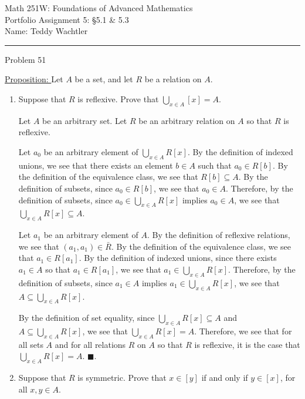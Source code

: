 \documentclass{article}
\theoremstyle{definition}
\newcommand{\header}[3]{
	\begin{center}
	\Large{{#1}} \\
	\smallskip \normalsize {#2} \\
	\smallskip \hfill Name: {#3} \\
	\smallskip \hrule
	\bigskip
	\end{center}}
\newcommand{\problem}[1]{
	\noindent Problem {#1}
	\medskip }
\newcommand{\proposition}{\underline{Proposition: }}
\renewcommand{\proof}{
	\medskip \fbox{Proof}
	\medskip }
\renewcommand{\qed}{\blacksquare}
\begin{document}
	\header
	{Math 251W: Foundations of Advanced Mathematics}
	{Portfolio Assignment 5: \S 5.1 \& 5.3}
	{Teddy Wachtler}


	\problem{51}

	\proposition
	Let $A$ be a set, and let $R$ be a relation on $A$.

	\begin{enumerate}
		\item
		Suppose that $R$ is reflexive.
		Prove that $\bigcup_{x \in A} [x] = A$.

		\proof

		Let $A$ be an arbitrary set.
		Let $R$ be an arbitrary relation on $A$ so that $R$ is reflexive.

		Let $a_0$ be an arbitrary element of $\bigcup_{x \in A} R[x]$.
		By the definition of indexed unions, we see that there exists an element $b \in A$ such that $a_0 \in R[b]$.
		By the definition of the equivalence class, we see that $R[b] \subseteq A$.
		By the definition of subsets, since $a_0 \in R[b]$, we see that $a_0 \in A$.
		Therefore, by the definition of subsets, since $a_0 \in \bigcup_{x \in A} R[x]$ implies $a_0 \in A$, we see that $\bigcup_{x \in A} R[x] \subseteq A$.

		Let $a_1$ be an arbitrary element of $A$.
		By the definition of reflexive relations, we see that $(a_1, a_1) \in \bar R$.
		By the definition of the equivalence class, we see that $a_1 \in R[a_1]$.
		By the definition of indexed unions, since there exists $a_1 \in A$ so that $a_1 \in R[a_1]$, we see that $a_1 \in \bigcup_{x \in A} R[x]$.
		Therefore, by the definition of subsets, since $a_1 \in A$ implies $a_1 \in \bigcup_{x \in A} R[x]$, we see that $A \subseteq \bigcup_{x \in A} R[x]$.

		By the definition of set equality, since $\bigcup_{x \in A} R[x] \subseteq A$ and $A \subseteq \bigcup_{x \in A} R[x]$, we see that $\bigcup_{x \in A} R[x] = A$.
		Therefore, we see that for all sets $A$ and for all relations $R$ on $A$ so that $R$ is reflexive, it is the case that $\bigcup_{x \in A} R[x] = A$.
		$\qed$.

		\smallskip

		\item
		Suppose that $R$ is symmetric.
		Prove that $x \in [y]$ if and only if $y\in [x]$, for all $x, y \in A$.

		\proof


\end{enumerate}
\end{document}
